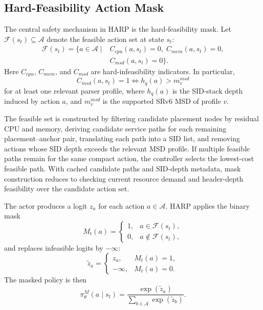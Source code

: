 \documentclass[final,5p]{elsarticle}
\begin{document}
\subsection{Hard-Feasibility Action Mask}
\label{subsec:harp_masking}

The central safety mechanism in HARP is the hard-feasibility mask. Let \(\mathcal{F}(s_t)\subseteq\mathcal{A}\) denote the feasible action set at state \(s_t\):
\begin{equation}
\begin{aligned}
\mathcal{F}(s_t)=
\{a\in\mathcal{A}\mid
& C_{cpu}(a,s_t)=0,\;
  C_{mem}(a,s_t)=0, \\
& C_{msd}(a,s_t)=0
\}.
\end{aligned}
\label{eq:feasible_set}
\end{equation}
Here \(C_{cpu}\), \(C_{mem}\), and \(C_{msd}\) are hard-infeasibility indicators. In particular,
\begin{equation}
    C_{msd}(a,s_t)=1
    \Longleftrightarrow
    h_q(a)>m_v^{msd}
\end{equation}
for at least one relevant parser profile, where \(h_q(a)\) is the SID-stack depth induced by action \(a\), and \(m_v^{msd}\) is the supported SRv6 MSD of profile \(v\).

The feasible set is constructed by filtering candidate placement nodes by residual CPU and memory, deriving candidate service paths for each remaining placement--anchor pair, translating each path into a SID list, and removing actions whose SID depth exceeds the relevant MSD profile. If multiple feasible paths remain for the same compact action, the controller selects the lowest-cost feasible path. With cached candidate paths and SID-depth metadata, mask construction reduces to checking current resource demand and header-depth feasibility over the candidate action set.

The actor produces a logit \(z_a\) for each action \(a\in\mathcal{A}\). HARP applies the binary mask
\begin{equation}
    M_t(a)=
    \begin{cases}
        1, & a\in\mathcal{F}(s_t),\\
        0, & a\notin\mathcal{F}(s_t),
    \end{cases}
\end{equation}
and replaces infeasible logits by \(-\infty\):
\begin{equation}
    \tilde{z}_a=
    \begin{cases}
        z_a, & M_t(a)=1,\\
        -\infty, & M_t(a)=0.
    \end{cases}
\end{equation}
The masked policy is then
\begin{equation}
    \pi_\theta^{M}(a\mid s_t)
    =
    \frac{\exp(\tilde{z}_a)}
    {\sum_{b\in\mathcal{A}}\exp(\tilde{z}_b)}.
\end{equation}
\end{document}
